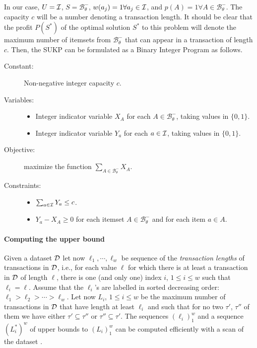In our case, $U={\cal I}$, $S=\mathcal{B}^-_\theta$, $w(a_j)=1 \forall a_j\in{\cal I}$,
and $p(A)=1\forall A\in\mathcal{B}^-_\theta$. The capacity $c$ will be a number
denoting a transaction length. It should be clear that the profit $P(S^*)$ of
the optimal solution $S^*$ to this problem will denote the maximum number of
itemsets from $\mathcal{B}^-_\theta$ that can appear in a transaction of length
$c$. Then, the SUKP can be formulated as a Binary Integer Program as follows.
\begin{description}
  \item[Constant:] Non-negative integer capacity $c$.
  \item[Variables:] \hfill
    \begin{itemize}
      \item Integer indicator variable $X_A$ for each
	$A\in\mathcal{B^-_\theta}$, taking values in $\{0,1\}$.
      \item Integer indicator variable $Y_a$ for each $a\in{\cal I}$, taking values
	in $\{0,1\}$.
    \end{itemize}
  \item[Objective:] maximize the function $\sum_{A\in\mathcal{B^-_\theta}}X_A$.
  \item[Constraints:] \hfill
    \begin{itemize}
      \item $\sum_{a\in{\cal I}} Y_a\le c$.
      \item $Y_a-X_A\ge 0$ for each itemset $A\in\mathcal{B^-_\theta}$ and for each item $a\in A$.
    \end{itemize}
\end{description}

\paragraph{Computing the upper bound}
Given a dataset ${\cal D}$ let now $\ell_1,\cdots,\ell_w$ be sequence of the
\emph{transaction lengths} of transactions in ${\cal D}$, i.e., for each value $\ell$
for which there is at least a transaction in ${\cal D}$ of length $\ell$, there is
one (and only one) index $i$, $1\le i\le w$ such that $\ell_i=\ell$. Assume that
the $\ell_i$'s are labelled in sorted decreasing order:
$\ell_1>\ell_2>\dotsb>\ell_w$. Let now $L_i$, $1\le i\le w$ be the maximum
number of transactions in ${\cal D}$ that have length at least $\ell_i$ and such that
for no two $\tau'$, $\tau''$ of them we have either $\tau'\subseteq\tau''$ or
$\tau''\subseteq\tau'$. The sequences $(\ell_i)_1^w$ and a sequence $(L_i^*)^w$
of upper bounds to $(L_i)_1^w$ can be computed efficiently with a scan of the
dataset .

